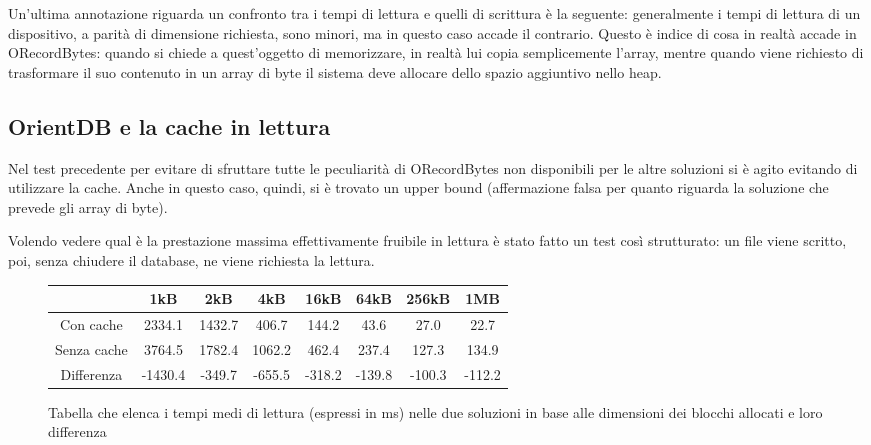 Un'ultima annotazione riguarda un confronto tra i tempi di lettura e quelli di scrittura è la seguente: generalmente i tempi di lettura di un dispositivo, a parità di dimensione richiesta, sono minori, ma in questo caso accade il contrario. Questo è indice di cosa in realtà accade in ORecordBytes: quando si chiede a quest'oggetto di memorizzare, in realtà lui copia semplicemente l'array, mentre quando viene richiesto di trasformare il suo contenuto in un array di byte il sistema deve allocare dello spazio aggiuntivo nello heap.

\subsection{OrientDB e la cache in lettura}
Nel test precedente per evitare di sfruttare tutte le peculiarità di ORecordBytes non disponibili per le altre soluzioni si è agito evitando di utilizzare la cache. Anche in questo caso, quindi, si è trovato un upper bound (affermazione falsa per quanto riguarda la soluzione che prevede gli array di byte).

Volendo vedere qual è la prestazione massima effettivamente fruibile in lettura è stato fatto un test così strutturato: un file viene scritto, poi, senza chiudere il database, ne viene richiesta la lettura. 

\begin{figure}
\centering
\begin{tabular}{cccccccc}
\toprule
\textbf{} & \textbf{1kB} & \textbf{2kB} & \textbf{4kB} & \textbf{16kB} & \textbf{64kB} & \textbf{256kB} & \textbf{1MB}\\
\midrule
Con cache & 2334.1 & 1432.7 & 406.7 & 144.2 & 43.6 & 27.0 & 22.7\\
Senza cache & 3764.5 & 1782.4 & 1062.2 & 462.4 & 237.4 & 127.3 & 134.9 \\
Differenza & -1430.4 & -349.7 & -655.5 & -318.2 & -139.8 & -100.3 & -112.2\\
\bottomrule
\end{tabular}
\caption{Tabella che elenca i tempi medi di lettura (espressi in ms) nelle due soluzioni in base alle dimensioni dei blocchi allocati e loro differenza}
\label{:}
\end{figure}

